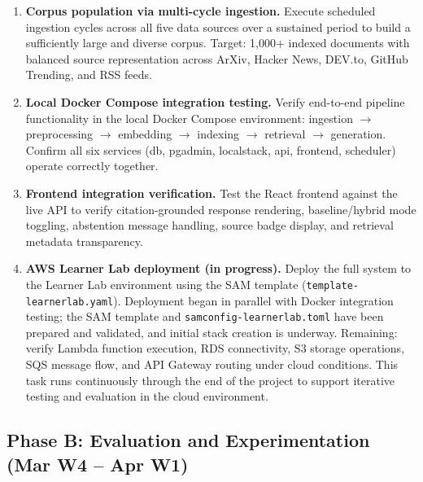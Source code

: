 \documentclass[12pt,a4paper]{report}
\begin{document}
\begin{enumerate}[leftmargin=0.5in]
  \item \textbf{Corpus population via multi-cycle ingestion.} Execute scheduled ingestion cycles across all five data sources over a sustained period to build a sufficiently large and diverse corpus. Target: 1,000+ indexed documents with balanced source representation across ArXiv, Hacker News, DEV.to, GitHub Trending, and RSS feeds.

  \item \textbf{Local Docker Compose integration testing.} Verify end-to-end pipeline functionality in the local Docker Compose environment: ingestion $\to$ preprocessing $\to$ embedding $\to$ indexing $\to$ retrieval $\to$ generation. Confirm all six services (db, pgadmin, localstack, api, frontend, scheduler) operate correctly together.

  \item \textbf{Frontend integration verification.} Test the React frontend against the live API to verify citation-grounded response rendering, baseline/hybrid mode toggling, abstention message handling, source badge display, and retrieval metadata transparency.

  \item \textbf{AWS Learner Lab deployment (in progress).} Deploy the full system to the Learner Lab environment using the SAM template (\texttt{template-learnerlab.yaml}). Deployment began in parallel with Docker integration testing; the SAM template and \texttt{samconfig-learnerlab.toml} have been prepared and validated, and initial stack creation is underway. Remaining: verify Lambda function execution, RDS connectivity, S3 storage operations, SQS message flow, and API Gateway routing under cloud conditions. This task runs continuously through the end of the project to support iterative testing and evaluation in the cloud environment.
\end{enumerate}

\subsection{Phase B: Evaluation and Experimentation (Mar W4 -- Apr W1)}
\end{document}
